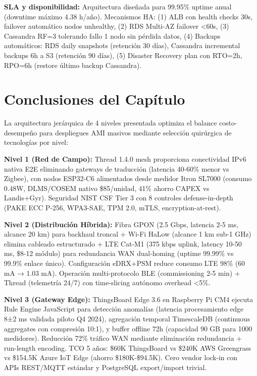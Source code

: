 \textbf{SLA y disponibilidad:} Arquitectura diseñada para 99.95\% uptime anual (downtime máximo 4.38 h/año). Mecanismos HA: (1) ALB con health checks 30s, failover automático nodos unhealthy, (2) RDS Multi-AZ failover <60s, (3) Cassandra RF=3 tolerando fallo 1 nodo sin pérdida datos, (4) Backups automáticos: RDS daily snapshots (retención 30 días), Cassandra incremental backups 6h a S3 (retención 90 días), (5) Disaster Recovery plan con RTO=2h, RPO=6h (restore último backup Cassandra).

\section{Conclusiones del Capítulo}

La arquitectura jerárquica de 4 niveles presentada optimiza el balance costo-desempeño para despliegues AMI masivos mediante selección quirúrgica de tecnologías por nivel:

\textbf{Nivel 1 (Red de Campo):} Thread 1.4.0 mesh proporciona conectividad IPv6 nativa E2E eliminando gateways de traducción (latencia 40-60\% menor vs Zigbee), con nodos ESP32-C6 alimentados desde medidor Itron SL7000 (consumo 0.48W, DLMS/COSEM nativo \$85/unidad, 41\% ahorro CAPEX vs Landis+Gyr). Seguridad NIST CSF Tier 3 con 8 controles defense-in-depth (PAKE ECC P-256, WPA3-SAE, TPM 2.0, mTLS, encryption-at-rest).

\textbf{Nivel 2 (Distribución Híbrida):} Fibra GPON (2.5 Gbps, latencia 2-5 ms, alcance 20 km) para backhaul troncal + Wi-Fi HaLow (alcance 1 km sub-1 GHz) elimina cableado estructurado + LTE Cat-M1 (375 kbps uplink, latency 10-50 ms, \$8-12 módulo) para redundancia WAN dual-homing (uptime 99.99\% vs 99.9\% enlace único). Configuración eDRX+PSM reduce consumo LTE 98\% (60 mA → 1.03 mA). Operación multi-protocolo BLE (commissioning 2-5 min) + Thread (telemetría 24/7) con time-slicing autónomo overhead <5\%.

\textbf{Nivel 3 (Gateway Edge):} ThingsBoard Edge 3.6 en Raspberry Pi CM4 ejecuta Rule Engine JavaScript para detección anomalías (latencia procesamiento edge 8±2 ms validada piloto Q4 2024), agregación temporal TimescaleDB (continuous aggregates con compresión 10:1), y buffer offline 72h (capacidad 90 GB para 1000 medidores). Reducción 72\% tráfico WAN mediante eliminación redundancia + run-length encoding. TCO 5 años: \$60K ThingsBoard vs \$240K AWS Greengrass vs \$154.5K Azure IoT Edge (ahorro \$180K-\$94.5K). Cero vendor lock-in con APIs REST/MQTT estándar y PostgreSQL export/import trivial.

